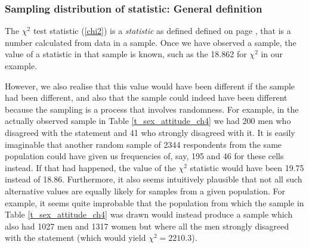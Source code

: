 \subsubsection{Sampling distribution of statistic: General definition}

The $\chi^{2}$ test statistic (\ref{chi2}) is a \emph{statistic} as
defined defined on page \pageref{p_statistic}, that is a number
calculated from data in a sample. Once we have observed a sample, the
value of a statistic in that sample is known, such as the 18.862 for
$\chi^{2}$ in our example.

However, we also realise that this value would have been different if the
sample had been different, and also that the sample could indeed have
been different because the sampling is a process that involves
randomness. For example, in the actually observed sample in Table
\ref{t_sex_attitude_ch4} we had 200 men who disagreed with the statement
and 41 who strongly disagreed with it. It is easily imaginable that
another random sample of 2344 respondents from the same population could
have given us frequencies of, say, 195 and 46 for these cells instead.
If that had happened, the value of the $\chi^{2}$ statistic would have
been 19.75 instead of 18.86. Furthermore, it also seems intuitively
plausible that not all such alternative values are equally likely for
samples from a given population. For example, it seems quite improbable
that the population from which the sample in Table
\ref{t_sex_attitude_ch4} was drawn would instead produce a sample which
also had 1027 men and 1317 women but where all the men strongly
disagreed with the statement (which would yield $\chi^{2}=2210.3$).

